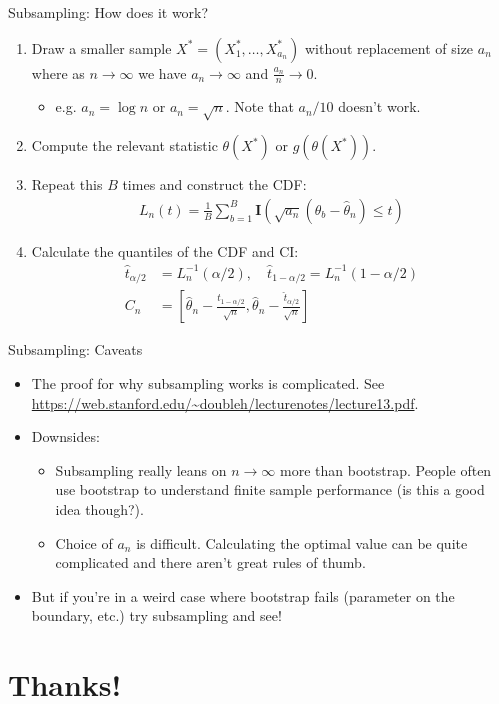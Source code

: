 \documentclass[aspectratio=169]{beamer}
\begin{document}
\begin{frame}{Subsampling: How does it work?}
\begin{enumerate}
\item Draw a \alert{smaller} sample $X^*=(X_1^*,\ldots,X_{a_n}^*)$ \alert{without replacement} of size $a_n$ where as $n \rightarrow \infty$ we have $a_n \rightarrow \infty$ and $\frac{a_n}{n} \rightarrow 0$.
\begin{itemize}
\item e.g. $a_n = \log n$ or $a_n = \sqrt{n}$. Note that $a_n / 10$ doesn't work.
\end{itemize}
\item Compute the relevant statistic $\theta(X^*)$ or $g(\theta(X^*))$.
\item Repeat this $B$ times and construct the CDF:
\begin{align*}
L_n(t) = \frac{1}{B} \sum_{b=1}^B \mathbf{I} \left( \sqrt{a_n}(\widehat{\theta}_b - \widehat{\theta}_n  )  \leq t \right)
\end{align*}
\item Calculate the quantiles of the CDF and CI:
\begin{align*}
\hat{t}_{\alpha / 2}&=L_{n}^{-1}(\alpha / 2), \quad \hat{t}_{1-\alpha / 2}=L_{n}^{-1}(1-\alpha / 2)\\
C_{n}&=\left[\hat{\theta}_{n}-\frac{\hat{t}_{1-\alpha / 2}}{\sqrt{n}}, \hat{\theta}_{n}-\frac{\hat{t}_{\alpha / 2}}{\sqrt{n}}\right]
\end{align*}
\end{enumerate}
\end{frame}



\begin{frame}{Subsampling: Caveats}
\begin{itemize}
\item The proof for \alert{why} subsampling works is complicated. See \url{https://web.stanford.edu/~doubleh/lecturenotes/lecture13.pdf}.
\item Downsides:
\begin{itemize}
\item Subsampling really leans on $n \rightarrow \infty$ more than bootstrap. People often use bootstrap to understand finite sample performance (is this a good idea though?).
\item Choice of $a_n$ is difficult. Calculating the optimal value can be quite complicated and there aren't great rules of thumb.
\end{itemize}
\item But if you're in a weird case where bootstrap fails (parameter on the boundary, etc.) try subsampling and see!
\end{itemize}
\end{frame}


\section*{Thanks!}
\end{document}
